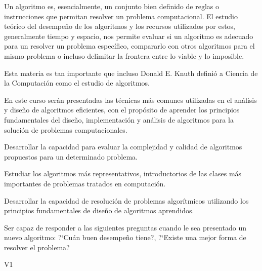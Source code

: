 \begin{syllabus}

    
    \begin{justification}
    Un algoritmo es, esencialmente, un conjunto bien definido de reglas o instrucciones
    que permitan resolver un problema computacional. El estudio teórico del desempeño
    de los algoritmos y los recursos utilizados por estos, generalmente tiempo y espacio, 
    nos permite evaluar si un algoritmo es adecuado para un resolver un problema 
    específico, compararlo con otros algoritmos para el mismo problema o incluso
    delimitar la frontera entre lo viable y lo imposible.
    
    Esta materia es tan importante que incluso Donald E. Knuth definió a
    Ciencia de la Computación como el estudio de algoritmos.
    
    En este curso serán presentadas las técnicas más comunes utilizadas en el análisis y diseño de 
    algoritmos eficientes, con el propósito de aprender los principios fundamentales
    del diseño, implementación y análisis de algoritmos para la solución de problemas
    computacionales.
    \end{justification}
    
    \begin{goals} 
    \item Desarrollar la capacidad para evaluar la complejidad y calidad de algoritmos propuestos para un determinado problema.
    \item Estudiar los algoritmos más representativos, introductorios de las clases más importantes de problemas tratados en computación.
    \item Desarrollar la capacidad de resolución de problemas algorítmicos utilizando los principios fundamentales de diseño de algoritmos aprendidos.
    \item Ser capaz de responder a las siguientes preguntas cuando le sea presentado un nuevo algoritmo: ?`Cuán buen desempeño tiene?, ?`Existe una mejor forma de resolver el problema?
    \end{goals}
    
    \begin{outcomes}{V1}
        \item {} 
        \item {} 
    \end{outcomes}
    

\end{syllabus}
